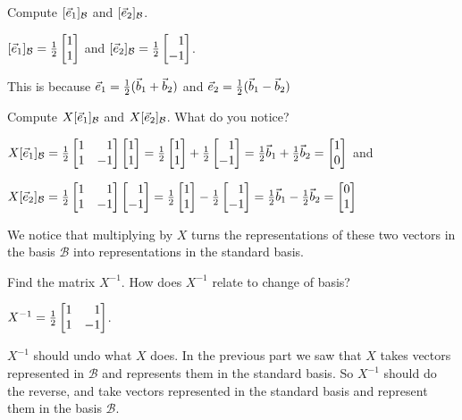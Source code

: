	\begin{parts}
		\item Compute $[{\vec e_1}]_{\mathcal B}$ and $[{\vec e_2}]_{\mathcal B}$.
			\begin{solution}
				$[\xhat]_{\mathcal B}=\frac{1}{2}\mat{1\\1}$ and
				$[\yhat]_{\mathcal B}=\frac{1}{2}\mat{1\\-1}$.

				This is because ${\vec e_1}=\frac{1}{2}(\vec b_1+\vec b_2)$ and
				${\vec e_2}=\frac{1}{2}(\vec b_1-\vec b_2)$
			\end{solution}
		\item Compute $X[{\vec e_1}]_{\mathcal B}$ and $X[{\vec e_2}]_{\mathcal B}$.
			What do you notice?
			\begin{solution}
				$X[\xhat]_{\mathcal B}=\frac{1}{2}\mat{1&1\\1&-1}\mat{1\\1}
				=\frac{1}{2}\mat{1\\1}+\frac{1}{2}\mat{1\\-1}
				=\frac{1}{2}\vec b_1+\frac{1}{2}\vec b_2=\mat{1\\0}$
				and

				$X[\yhat]_{\mathcal B}=\frac{1}{2}\mat{1&1\\1&-1}\mat{1\\-1}
				=\frac{1}{2}\mat{1\\1}-\frac{1}{2}\mat{1\\-1}
				=\frac{1}{2}\vec b_1-\frac{1}{2}\vec b_2=\mat{0\\1}$

				We notice that multiplying by $X$ turns the representations	of
				these two vectors in the basis $\mathcal B$ into representations
				in the standard basis.
			\end{solution}
		\item Find the matrix $X^{-1}$. How does $X^{-1}$ relate to change of basis?
			\begin{solution}
				$X^{-1}=\tfrac{1}{2}\mat{1&1\\1&-1}$.

				$X^{-1}$ should undo what $X$ does. In the previous part we saw
				that $X$ takes vectors represented in $\mathcal B$ and represents
				them in the standard basis. So $X^{-1}$ should do the reverse, and
				take vectors represented in the standard basis and represent them
				in the basis $\mathcal B$.
			\end{solution}
	\end{parts}


